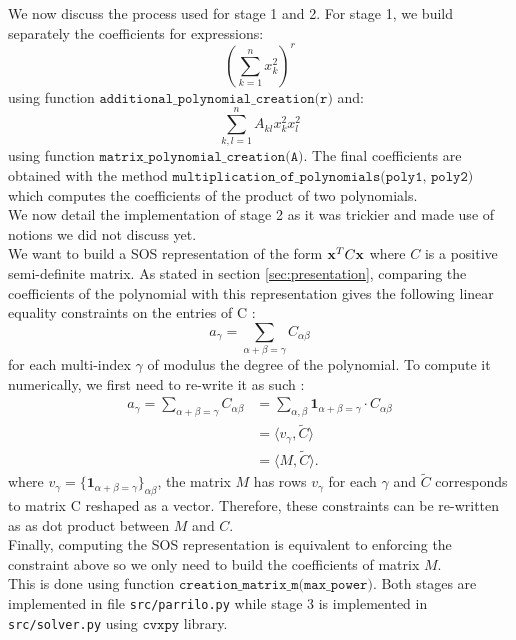\documentclass[onecolumn,11pt,a4paper]{article}
\theoremstyle{plain}  %
\theoremstyle{remark}  %
\begin{document}
We now discuss the process used for stage 1 and 2. For stage 1, we build separately the coefficients for expressions:
\begin{equation}
	\left(\sum_{k = 1}^n x_k^2\right)^r
\end{equation}
using function $\texttt{additional\_polynomial\_creation(r)}$ and:
\begin{equation}
	\sum_{k, l = 1}^n A_{kl} x_k^2 x_l^2
\end{equation}
using function $\texttt{matrix\_polynomial\_creation(A)}$. The final coefficients are obtained with the method
$\texttt{multiplication\_of\_polynomials(poly1, poly2)}$ which computes the coefficients of the product of two polynomials.\\
We now detail the implementation of stage 2 as it was trickier and made use of notions we did not discuss yet.\\
We want to build a SOS representation of the form $\vb{x}^T C \vb{x}$ where $C$ is a positive semi-definite matrix. As stated in section \ref{sec:presentation}, comparing the coefficients of the polynomial with this representation gives the following linear equality constraints on the entries of C :
\begin{equation}
    a_{\gamma} = \sum\limits_{\alpha + \beta = \gamma}C_{\alpha\beta}
\end{equation}
for each multi-index $\gamma$ of modulus the degree of the polynomial. To compute it numerically, we first need to re-write it as such :
\begin{align*}
    a_{\gamma} = \sum\limits_{\alpha + \beta = \gamma}C_{\alpha\beta} & = \sum\limits_{\alpha,\beta} \textbf{1}_{\alpha + \beta = \gamma} \cdot C_{\alpha\beta} \\
    & = \langle v_{\gamma},\widetilde{C}\rangle \\
    & = \langle M,\widetilde{C}\rangle.
\end{align*}
where $v_{\gamma}=\{ \textbf{1}_{\alpha + \beta = \gamma}\}_{\alpha\beta}$, the matrix $M$ has rows $v_{\gamma}$ for each $\gamma$ and $\widetilde{C}$ corresponds to matrix C reshaped as a vector. Therefore, these constraints can be re-written as as dot product between $M$ and $C$. \\ Finally, computing the SOS representation is equivalent to enforcing the constraint above so we only need to build the coefficients of matrix $M$. \\ This is done using function $\texttt{creation\_matrix\_m(max\_power)}$.
Both stages are implemented in file \texttt{src/parrilo.py} while stage 3 is implemented in
\texttt{src/solver.py} using $\texttt{cvxpy}$ library.
\end{document}
